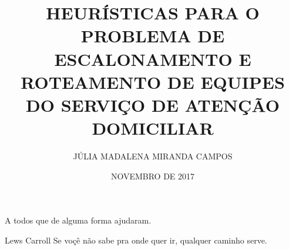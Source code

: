 \documentclass[qual, classic, a4paper]{ufbathesis}
\institute{INSTITUTO DE MATEM\'{A}TICA}
\title{HEURÍSTICAS PARA O PROBLEMA DE  ESCALONAMENTO E ROTEAMENTO DE EQUIPES DO SERVIÇO DE ATEN\c{C}\~AO DOMICILIAR}
\date{NOVEMBRO DE 2017}
\author{JÚLIA MADALENA MIRANDA CAMPOS}
\begin{document}


\frontpage

\frontmatter

\presentationpage






\acknowledgements
A todos que de alguma forma ajudaram.

 \begin{epigraph}[]{Lews Carroll}
  Se vo\c{c}\^{e} n\~{a}o sabe pra onde quer ir, qualquer caminho serve.
 \end{epigraph}






\listoffigures

\listoftables

\mainmatter
\end{document}
